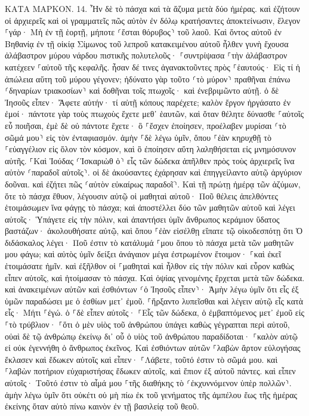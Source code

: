 \documentclass[twoside, 9pt]{extreport}
\begin{document}
ΚΑΤΑ ΜΑΡΚΟΝ.
14.
Ἦν δὲ τὸ πάσχα καὶ τὰ ἄζυμα μετὰ δύο ἡμέρας. καὶ ἐζήτουν οἱ ἀρχιερεῖς καὶ οἱ γραμματεῖς πῶς αὐτὸν ἐν δόλῳ κρατήσαντες ἀποκτείνωσιν, 
ἔλεγον ⸀γάρ· Μὴ ἐν τῇ ἑορτῇ, μήποτε ⸂ἔσται θόρυβος⸃ τοῦ λαοῦ. 
Καὶ ὄντος αὐτοῦ ἐν Βηθανίᾳ ἐν τῇ οἰκίᾳ Σίμωνος τοῦ λεπροῦ κατακειμένου αὐτοῦ ἦλθεν γυνὴ ἔχουσα ἀλάβαστρον μύρου νάρδου πιστικῆς πολυτελοῦς· ⸀συντρίψασα ⸀τὴν ἀλάβαστρον κατέχεεν ⸀αὐτοῦ τῆς κεφαλῆς. 
ἦσαν δέ τινες ἀγανακτοῦντες πρὸς ⸀ἑαυτούς· Εἰς τί ἡ ἀπώλεια αὕτη τοῦ μύρου γέγονεν; 
ἠδύνατο γὰρ τοῦτο ⸂τὸ μύρον⸃ πραθῆναι ἐπάνω ⸂δηναρίων τριακοσίων⸃ καὶ δοθῆναι τοῖς πτωχοῖς· καὶ ἐνεβριμῶντο αὐτῇ. 
ὁ δὲ Ἰησοῦς εἶπεν· Ἄφετε αὐτήν· τί αὐτῇ κόπους παρέχετε; καλὸν ἔργον ἠργάσατο ἐν ἐμοί· 
πάντοτε γὰρ τοὺς πτωχοὺς ἔχετε μεθ᾽ ἑαυτῶν, καὶ ὅταν θέλητε δύνασθε ⸀αὐτοῖς εὖ ποιῆσαι, ἐμὲ δὲ οὐ πάντοτε ἔχετε· 
ὃ ⸀ἔσχεν ἐποίησεν, προέλαβεν μυρίσαι ⸂τὸ σῶμά μου⸃ εἰς τὸν ἐνταφιασμόν. 
ἀμὴν ⸀δὲ λέγω ὑμῖν, ὅπου ⸀ἐὰν κηρυχθῇ τὸ ⸀εὐαγγέλιον εἰς ὅλον τὸν κόσμον, καὶ ὃ ἐποίησεν αὕτη λαληθήσεται εἰς μνημόσυνον αὐτῆς. 
⸀Καὶ Ἰούδας ⸂Ἰσκαριὼθ ὁ⸃ εἷς τῶν δώδεκα ἀπῆλθεν πρὸς τοὺς ἀρχιερεῖς ἵνα αὐτὸν ⸂παραδοῖ αὐτοῖς⸃. 
οἱ δὲ ἀκούσαντες ἐχάρησαν καὶ ἐπηγγείλαντο αὐτῷ ἀργύριον δοῦναι. καὶ ἐζήτει πῶς ⸂αὐτὸν εὐκαίρως παραδοῖ⸃. 
Καὶ τῇ πρώτῃ ἡμέρᾳ τῶν ἀζύμων, ὅτε τὸ πάσχα ἔθυον, λέγουσιν αὐτῷ οἱ μαθηταὶ αὐτοῦ· Ποῦ θέλεις ἀπελθόντες ἑτοιμάσωμεν ἵνα φάγῃς τὸ πάσχα; 
καὶ ἀποστέλλει δύο τῶν μαθητῶν αὐτοῦ καὶ λέγει αὐτοῖς· Ὑπάγετε εἰς τὴν πόλιν, καὶ ἀπαντήσει ὑμῖν ἄνθρωπος κεράμιον ὕδατος βαστάζων· ἀκολουθήσατε αὐτῷ, 
καὶ ὅπου ⸀ἐὰν εἰσέλθῃ εἴπατε τῷ οἰκοδεσπότῃ ὅτι Ὁ διδάσκαλος λέγει· Ποῦ ἐστιν τὸ κατάλυμά ⸀μου ὅπου τὸ πάσχα μετὰ τῶν μαθητῶν μου φάγω; 
καὶ αὐτὸς ὑμῖν δείξει ἀνάγαιον μέγα ἐστρωμένον ἕτοιμον· ⸀καὶ ἐκεῖ ἑτοιμάσατε ἡμῖν. 
καὶ ἐξῆλθον οἱ ⸀μαθηταὶ καὶ ἦλθον εἰς τὴν πόλιν καὶ εὗρον καθὼς εἶπεν αὐτοῖς, καὶ ἡτοίμασαν τὸ πάσχα. 
Καὶ ὀψίας γενομένης ἔρχεται μετὰ τῶν δώδεκα. 
καὶ ἀνακειμένων αὐτῶν καὶ ἐσθιόντων ⸂ὁ Ἰησοῦς εἶπεν⸃· Ἀμὴν λέγω ὑμῖν ὅτι εἷς ἐξ ὑμῶν παραδώσει με ὁ ἐσθίων μετ᾽ ἐμοῦ. 
⸀ἤρξαντο λυπεῖσθαι καὶ λέγειν αὐτῷ εἷς κατὰ εἷς· Μήτι ⸀ἐγώ. 
ὁ ⸀δὲ εἶπεν αὐτοῖς· ⸀Εἷς τῶν δώδεκα, ὁ ἐμβαπτόμενος μετ᾽ ἐμοῦ εἰς ⸀τὸ τρύβλιον· 
⸀ὅτι ὁ μὲν υἱὸς τοῦ ἀνθρώπου ὑπάγει καθὼς γέγραπται περὶ αὐτοῦ, οὐαὶ δὲ τῷ ἀνθρώπῳ ἐκείνῳ δι᾽ οὗ ὁ υἱὸς τοῦ ἀνθρώπου παραδίδοται· ⸀καλὸν αὐτῷ εἰ οὐκ ἐγεννήθη ὁ ἄνθρωπος ἐκεῖνος. 
Καὶ ἐσθιόντων αὐτῶν ⸀λαβὼν ἄρτον εὐλογήσας ἔκλασεν καὶ ἔδωκεν αὐτοῖς καὶ εἶπεν· ⸀Λάβετε, τοῦτό ἐστιν τὸ σῶμά μου. 
καὶ ⸀λαβὼν ποτήριον εὐχαριστήσας ἔδωκεν αὐτοῖς, καὶ ἔπιον ἐξ αὐτοῦ πάντες. 
καὶ εἶπεν αὐτοῖς· Τοῦτό ἐστιν τὸ αἷμά μου ⸀τῆς διαθήκης τὸ ⸂ἐκχυννόμενον ὑπὲρ πολλῶν⸃. 
ἀμὴν λέγω ὑμῖν ὅτι οὐκέτι οὐ μὴ πίω ἐκ τοῦ γενήματος τῆς ἀμπέλου ἕως τῆς ἡμέρας ἐκείνης ὅταν αὐτὸ πίνω καινὸν ἐν τῇ βασιλείᾳ τοῦ θεοῦ. 
\end{document}
